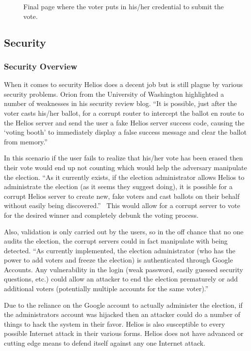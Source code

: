 \begin{figure}
  \centering {}
  \caption{Final page where the voter puts in his/her credential to
    submit the vote.}
  \label{fig:helios-submit}
\end{figure}

\subsection{Security}

\subsubsection{Security Overview}

When it comes to security Helios does a decent job but is still plague
by various security problems. Orion from the University of Washington
highlighted a number of weaknesses in his security review blog. ``It
is possible, just after the voter casts his/her ballot, for a corrupt
router to intercept the ballot en route to the Helios server and send
the user a fake Helios server success code, causing the `voting booth'
to immediately display a false success message and clear the ballot
from memory.''~\cite{orion2009}

In this scenario if the user fails to realize that his/her vote has
been erased then their vote would end up not counting which would help
the adversary manipulate the election. ``As it currently exists, if
the election administrator allows Helios to administrate the election
(as it seems they suggest doing), it is possible for a corrupt Helios
server to create new, fake voters and cast ballots on their behalf
without easily being discovered.''~\cite{orion2009} This would allow
for a corrupt server to vote for the desired winner and completely
debunk the voting process.

Also, validation is only carried out by the users, so in the off
chance that no one audits the election, the corrupt servers could in
fact manipulate with being detected. ``As currently implemented, the
election administrator (who has the power to add voters and freeze the
election) is authenticated through Google Accounts. Any vulnerability
in the login (weak password, easily guessed security questions, etc.)
could allow an attacker to end the election prematurely or add
additional voters (potentially multiple accounts for the same
voter).''~\cite{orion2009}

Due to the reliance on the Google account to actually administer the
election, if the administrators account was hijacked then an attacker
could do a number of things to hack the system in their favor. Helios
is also susceptible to every possible Internet attack in their various
forms. Helios does not have advanced or cutting edge means to defend
itself against any one Internet attack.


